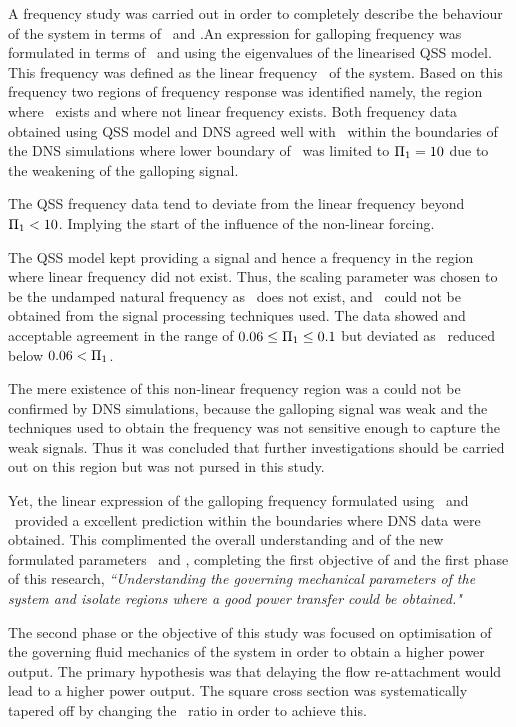  A frequency study was carried out in order to completely describe the behaviour of the system in terms of \massstiff\ and \massdamp.An expression for galloping frequency was formulated in terms of \massstiff\ and \massdamp using the eigenvalues of the linearised QSS model. This frequency was defined as the linear frequency \freqlin\ of the system. Based on this frequency two regions of frequency response was identified namely, the region where \freqlin\ exists and where not linear frequency exists. Both frequency data obtained using QSS model and DNS agreed well with \freqlin\ within the boundaries of the DNS simulations where lower boundary of \massstiff\ was limited to $\Pi_1=10$ due to the weakening of the galloping signal.
 
 The QSS frequency data tend to deviate from the linear frequency beyond $\Pi_1<10$. Implying the start of the influence of the non-linear forcing. 
 
 The QSS model kept providing a signal and hence a frequency in the region where linear frequency did not exist. Thus, the scaling parameter was chosen to be the undamped natural frequency as \freqlin\ does not exist, and \freqdns\ could not be obtained from the signal processing techniques used. The data showed and acceptable agreement  in the range of $0.06\leq\Pi_1\leq0.1$ but deviated as \massstiff\ reduced below $0.06<\Pi_1$.
 
 The mere existence of this non-linear frequency region was a could not be confirmed by DNS simulations, because the galloping signal was weak and the techniques used to obtain the  frequency was not sensitive enough to capture the weak signals. Thus it was concluded that further investigations should be carried out on this region but was not pursed in this study.
 
 Yet, the linear expression of the galloping frequency formulated using \massstiff\ and \massdamp\ provided a excellent prediction within the boundaries where DNS data were obtained. This complimented the overall understanding and of the new formulated parameters \massstiff\ and \massdamp, completing the first objective of and the first phase of this research, \emph{``Understanding the governing mechanical parameters of the system and isolate regions where a good power transfer could be obtained."}
 
 The second phase or the objective of this study was focused on optimisation of the governing fluid mechanics of the system in order to obtain a higher power output. The primary hypothesis was that delaying the flow re-attachment would lead to a higher power output. The square cross section was systematically tapered off by changing the \ratio\ ratio in order to achieve this.
 
